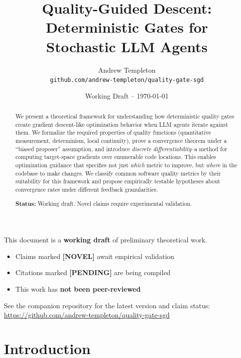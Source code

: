 \documentclass[11pt,a4paper]{article}
\title{Quality-Guided Descent: Deterministic Gates for\\Stochastic LLM Agents}
\author{
  Andrew Templeton\\
  \texttt{github.com/andrew-templeton/quality-gate-sgd}
}
\date{Working Draft -- \today}
\begin{document}
\maketitle

\begin{draftnotice}
This document is a \textbf{working draft} of preliminary theoretical work.
\begin{itemize}
  \item Claims marked \textbf{[NOVEL]} await empirical validation
  \item Citations marked \textbf{[PENDING]} are being compiled
  \item This work has \textbf{not been peer-reviewed}
\end{itemize}
See the companion repository for the latest version and claim status:\\
\url{https://github.com/andrew-templeton/quality-gate-sgd}
\end{draftnotice}

\begin{abstract}
We present a theoretical framework for understanding how deterministic quality gates create gradient descent-like optimization behavior when LLM agents iterate against them. We formalize the required properties of quality functions (quantitative measurement, determinism, local continuity), prove a convergence theorem under a ``biased proposer'' assumption, and introduce \emph{discrete differentiability}--a method for computing target-space gradients over enumerable code locations. This enables optimization guidance that specifies not just \emph{which} metric to improve, but \emph{where} in the codebase to make changes. We classify common software quality metrics by their suitability for this framework and propose empirically testable hypotheses about convergence rates under different feedback granularities.

\medskip
\noindent\textbf{Status:} Working draft. Novel claims require experimental validation.
\end{abstract}

\tableofcontents
\newpage

\section{Introduction}
\end{document}
